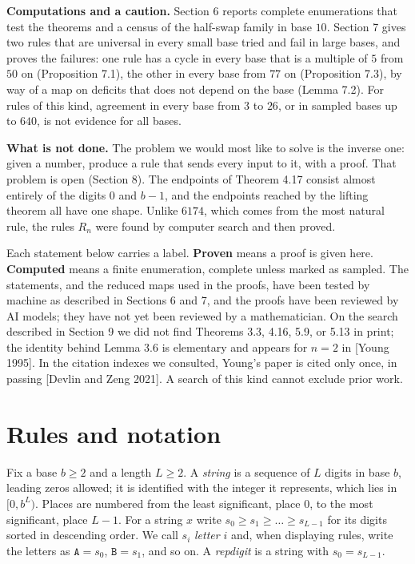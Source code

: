 \documentclass[11pt,letterpaper]{article}
\theoremstyle{paperstyle}
\theoremstyle{paperstyledef}
\theoremstyle{paperstylerem}
\begin{document}
\textbf{Computations and a caution.} Section 6 reports complete enumerations that test the theorems and a census of the half-swap family in base \(10\). Section 7 gives two rules that are universal in every small base tried and fail in large bases, and proves the failures: one rule has a cycle in every base that is a multiple of \(5\) from \(50\) on (Proposition 7.1), the other in every base from \(77\) on (Proposition 7.3), by way of a map on deficits that does not depend on the base (Lemma 7.2). For rules of this kind, agreement in every base from \(3\) to \(26\), or in sampled bases up to \(640\), is not evidence for all bases.

\textbf{What is not done.} The problem we would most like to solve is the inverse one: given a number, produce a rule that sends every input to it, with a proof. That problem is open (Section 8). The endpoints of Theorem 4.17 consist almost entirely of the digits \(0\) and \(b-1\), and the endpoints reached by the lifting theorem all have one shape. Unlike \(6174\), which comes from the most natural rule, the rules \(R_n\) were found by computer search and then proved.

Each statement below carries a label. \textbf{Proven} means a proof is given here. \textbf{Computed} means a finite enumeration, complete unless marked as sampled. The statements, and the reduced maps used in the proofs, have been tested by machine as described in Sections 6 and 7, and the proofs have been reviewed by AI models; they have not yet been reviewed by a mathematician. On the search described in Section 9 we did not find Theorems 3.3, 4.16, 5.9, or 5.13 in print; the identity behind Lemma 3.6 is elementary and appears for \(n = 2\) in {[}Young 1995{]}. In the citation indexes we consulted, Young's paper is cited only once, in passing {[}Devlin and Zeng 2021{]}. A search of this kind cannot exclude prior work.

\section{Rules and notation}\label{rules-and-notation}

Fix a base \(b \geq 2\) and a length \(L \geq 2\). A \emph{string} is a sequence of \(L\) digits in base \(b\), leading zeros allowed; it is identified with the integer it represents, which lies in \([0, b^L)\). Places are numbered from the least significant, place \(0\), to the most significant, place \(L-1\). For a string \(x\) write \(s_0 \geq s_1 \geq \dots \geq s_{L-1}\) for its digits sorted in descending order. We call \(s_i\) \emph{letter} \(i\) and, when displaying rules, write the letters as \(\mathtt{A} = s_0\), \(\mathtt{B} = s_1\), and so on. A \emph{repdigit} is a string with \(s_0 = s_{L-1}\).
\end{document}
